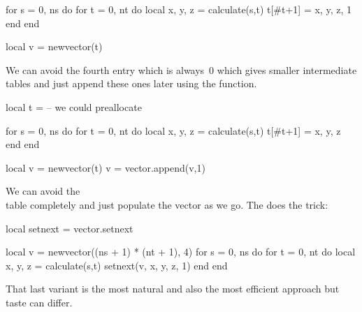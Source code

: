 for s = 0, ns do
    for t = 0, nt do
        local x, y, z = calculate(s,t)
        t[#t+1] = { x, y, z, 1 }
   end
end

local v = newvector(t)
\stoptyping

We can avoid the fourth entry which is always~0 which gives smaller
intermediate tables and just append these ones later using
the  function.

\starttyping[option=LUA]
local t = { }  -- we could preallocate

for s = 0, ns do
    for t = 0, nt do
        local x, y, z = calculate(s,t)
        t[#t+1] = { x, y, z }
   end
end

local v = newvector(t)
v = vector.append(v,1)
\stoptyping

We can avoid the \LUA\\ table completely and just populate the
vector as we go. The  does the trick:

\starttyping[option=LUA]
local setnext = vector.setnext

local v = newvector((ns + 1) * (nt + 1), 4)
for s = 0, ns do
    for t = 0, nt do
        local x, y, z = calculate(s,t)
        setnext(v, x, y, z, 1)
   end
end
\stoptyping

That last variant is the most natural and also the most efficient approach but
taste can differ.

\stopsubsection

\stopsection

\stopdocument

%
